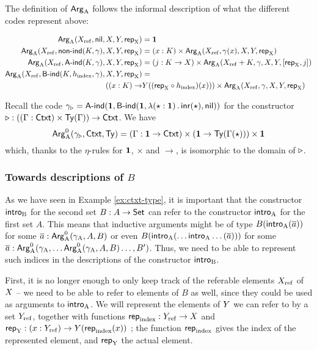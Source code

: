 \documentclass{article}
\begin{document}
The definition of $\mathsf{Arg}_{\mathrm{A}}$ follows the informal description of what the
different codes represent above:

\begin{align*} 
  \mathsf{Arg}_{\mathrm{A}}(X_{\mathrm{ref}}, \mathsf{nil}, X, Y, \mathsf{rep}_{\mathrm{X}}) &= \mathbf{1} \\
  \mathsf{Arg}_{\mathrm{A}}(X_{\mathrm{ref}}, \mathsf{non}\text{-}\mathsf{ind}(K, \gamma), X, Y, \mathsf{rep}_{\mathrm{X}}) &= (x : K) \times \mathsf{Arg}_{\mathrm{A}}(X_{\mathrm{ref}}, \gamma(x), X, Y, \mathsf{rep}_{\mathrm{X}}) \\
  \mathsf{Arg}_{\mathrm{A}}(X_{\mathrm{ref}}, \mathsf{A}\text{-}\mathsf{ind}(K, \gamma), X, Y, \mathsf{rep}_{\mathrm{X}}) &=  (j : K \to X) \times \mathsf{Arg}_{\mathrm{A}}(X_{\mathrm{ref}} + K, \gamma, X, Y, [\mathsf{rep}_{\mathrm{X}}, j]) \\
  \mathsf{Arg}_{\mathrm{A}}(X_{\mathrm{ref}}, \mathsf{B}\text{-}\mathsf{ind}(K, h_{\mathrm{index}}, \gamma), X, Y, \mathsf{rep}_{\mathrm{X}}) &= \\
 ((x : K) \to& Y((\mathsf{rep}_{\mathrm{X}} \circ h_{\mathrm{index}})(x))) \times \mathsf{Arg}_{\mathrm{A}}(X_{\mathrm{ref}}, \gamma, X, Y, \mathsf{rep}_{\mathrm{X}})
\end{align*}

\begin{example}
  Recall the code $\gamma_{\triangleright} = \mathsf{A}\text{-}\mathsf{ind}(\mathbf{1}, \mathsf{B}\text{-}\mathsf{ind}(\mathbf{1},
  \lambda (\star : \mathbf{1})\,.\,\mathsf{inr}(\star), \mathsf{nil}))$ for the
  constructor $\triangleright : ((\Gamma : \mathsf{Ctxt}) \times \mathsf{Ty}(\Gamma)) \to
  \mathsf{Ctxt}$. We have 
\[
\mathsf{Arg}^{0}_{\mathrm{A}}(\gamma_{\triangleright}, \mathsf{Ctxt}, \mathsf{Ty}) = (\Gamma : \mathbf{1} \to \mathsf{Ctxt})
\times (\mathbf{1} \to \mathsf{Ty}(\Gamma(\star))) \times \mathbf{1}
\]
which, thanks to the $\eta$-rules for $\mathbf{1}$, $\times$ and $\to$, is isomorphic to the
domain of $\triangleright$. 
\blackqed
\end{example}

\subsubsection{Towards descriptions of $B$} %
\label{sec:towards-SPB}

As we have seen in Example \ref{ex:ctxt-type}, it is important that
the constructor $\mathsf{intro}_{\mathrm{B}}$ for the second set $B : A \to \mathsf{Set}$ can
refer to the constructor $\mathsf{intro}_{\mathrm{A}}$ for the first set $A$. This means
that inductive arguments might be of type $B(\mathsf{intro}_{\mathrm{A}}(\overline{a}))$
for some $\overline{a} : \mathsf{Arg}^{0}_{\mathrm{A}}(\gamma_{\mathrm{A}}, A, B)$ or even
$B(\mathsf{intro}_{\mathrm{A}}(\ldots\mathsf{intro}_{\mathrm{A}}\ldots(\overline{a})))$ for some $\overline{a}
: \mathsf{Arg}^{0}_{\mathrm{A}}(\gamma_{\mathrm{A}}, \ldots \mathsf{Arg}^{0}_{\mathrm{A}}(\gamma_{\mathrm{A}}, A, B)\ldots, B')$. Thus, we
need to be able to represent such indices in the descriptions of the
constructor $\mathsf{intro}_{\mathrm{B}}$.

First, it is no longer enough to only keep track of the referable
elements $X_{\mathrm{ref}}$ of $X$ -- we need to be able to refer to elements of
$B$ as well, since they could be used as arguments to $\mathsf{intro}_{\mathrm{A}}$. We
will represent the elements of $Y$ we can refer to by a set $Y_{\mathrm{ref}}$,
together with functions $\mathsf{rep}_{\mathrm{index}} : Y_{\mathrm{ref}} \to X$ and $\mathsf{rep}_{\mathrm{Y}} : (x :
Y_{\mathrm{ref}}) \to Y(\mathsf{rep}_{\mathrm{index}}(x))$ ; the function $\mathsf{rep}_{\mathrm{index}}$ gives the index
of the represented element, and $\mathsf{rep}_{\mathrm{Y}}$ the actual element.
\end{document}

